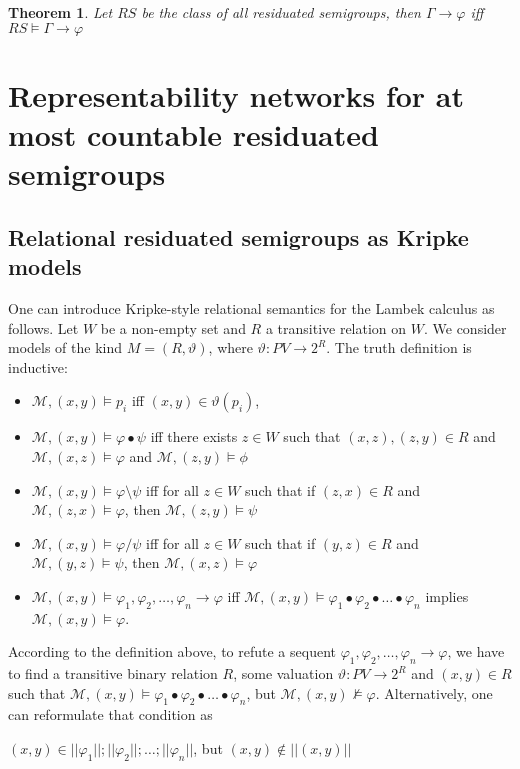 \documentclass[a4paper]{article}
\theoremstyle{defin}
\theoremstyle{theorem}
\newtheorem{theorem}{Theorem}
\theoremstyle{claim}
\theoremstyle{prop}
\theoremstyle{lemma}
\theoremstyle{fact}
\theoremstyle{ex}
\theoremstyle{col}
\begin{document}
\begin{theorem}
Let $RS$ be the class of all residuated semigroups, then $\Gamma \rightarrow \varphi$ iff $RS \models \Gamma \rightarrow \varphi$
\end{theorem}

\section{Representability networks for at most countable residuated semigroups}

\subsection{Relational residuated semigroups as Kripke models}

One can introduce Kripke-style relational semantics for the Lambek calculus as follows. Let $W$ be a non-empty set and $R$ a transitive relation on $W$. We consider models of the kind $M = (R, \vartheta)$, where $\vartheta : PV \to 2^R$. The truth definition is inductive:
\begin{itemize}
\item $\mathcal{M}, (x,y) \models p_i$ iff $(x, y) \in \vartheta(p_i)$,
\item $\mathcal{M}, (x,y) \models \varphi \bullet \psi$ iff there exists $z \in W$ such that
$(x,z), (z, y) \in R$ and $\mathcal{M}, (x, z) \models \varphi$ and $\mathcal{M}, (z, y) \models \phi$
\item $\mathcal{M}, (x, y) \models \varphi \setminus \psi$ iff for all $z \in W$ such that if $(z, x) \in R$ and $\mathcal{M}, (z, x) \models \varphi$, then $\mathcal{M}, (z, y) \models \psi$
\item $\mathcal{M}, (x, y) \models \varphi / \psi$ iff for all $z \in W$ such that if $(y, z) \in R$ and $\mathcal{M}, (y, z) \models \psi$, then $\mathcal{M}, (x, z) \models \varphi$
\item $\mathcal{M}, (x, y) \models \varphi_1, \varphi_2, \dots, \varphi_n \rightarrow \varphi$ iff $\mathcal{M}, (x, y) \models \varphi_1 \bullet \varphi_2 \bullet \dots \bullet \varphi_n$ implies $\mathcal{M}, (x, y) \models \varphi$.
\end{itemize}

According to the definition above, to refute a sequent $\varphi_1, \varphi_2, \dots, \varphi_n \rightarrow \varphi$, we have to find a transitive binary relation $R$, some valuation $\vartheta : PV \to 2^R$ and $(x, y) \in R$ such that
$\mathcal{M}, (x, y) \models \varphi_1 \bullet \varphi_2 \bullet \dots \bullet \varphi_n$, but $\mathcal{M}, (x, y) \nvDash \varphi$. Alternatively, one can reformulate that condition as
\begin{center}
$(x, y) \in ||\varphi_1|| ; ||\varphi_2|| ; \dots ; ||\varphi_n||$, but $(x, y) \notin ||(x, y)||$
\end{center}
\end{document}
